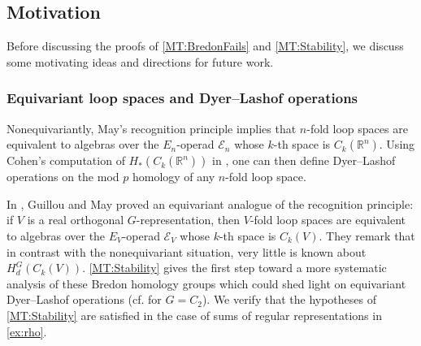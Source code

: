 \documentclass[11pt]{amsart}
\theoremstyle{definition}
\newtheorem{question}[equation]{Question}
\numberwithin{equation}{subsection} %
\newtheorem{thmx}{Theorem}
\def\r{\mathbb{R}}
\def\ce{\mathcal{E}}
\def\uM{\underline{M}}
\def\uM{\underline{M}}
\begin{document}




\subsection{Motivation}

Before discussing the proofs of \cref{MT:BredonFails} and \cref{MT:Stability}, we discuss some motivating ideas and directions for future work.

\subsubsection{Equivariant loop spaces and Dyer--Lashof operations}

Nonequivariantly, May's recognition principle \cite{May72} implies that $n$-fold loop spaces are equivalent to algebras over the $E_n$-operad $\ce_n$ whose $k$-th space is $C_k(\r^n)$. Using Cohen's computation of $H_*(C_k(\r^n))$ in \cite[Ch. III]{CLM76}, one can then define Dyer--Lashof operations on the mod $p$ homology of any $n$-fold loop space. 

In \cite{GM17}, Guillou and May proved an equivariant analogue of the recognition principle: if $V$ is a real orthogonal $G$-representation, then $V$-fold loop spaces are equivalent to algebras over the $E_V$-operad $\ce_V$ whose $k$-th space is $C_k(V)$. They remark that in contrast with the nonequivariant situation, very little is known about $H_d^G(C_k(V))$. \cref{MT:Stability} gives the first step toward a more systematic analysis of these Bredon homology groups which could shed light on equivariant Dyer--Lashof operations (cf. \cite{Wil19} for $G=C_2$). We verify that the hypotheses of \cref{MT:Stability} are satisfied in the case of sums of regular representations in \cref{ex:rho}.
\end{document}
